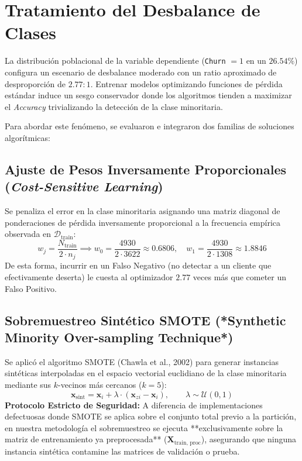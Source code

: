 \documentclass[11pt,letterpaper]{article}
\begin{document}
\section{Tratamiento del Desbalance de Clases}

La distribución poblacional de la variable dependiente (\texttt{Churn} $= 1$ en un $26.54\%$) configura un escenario de desbalance moderado con un ratio aproximado de desproporción de $2.77:1$. Entrenar modelos optimizando funciones de pérdida estándar induce un sesgo conservador donde los algoritmos tienden a maximizar el \textit{Accuracy} trivializando la detección de la clase minoritaria.

Para abordar este fenómeno, se evaluaron e integraron dos familias de soluciones algorítmicas:

\subsection{Ajuste de Pesos Inversamente Proporcionales (\textit{Cost-Sensitive Learning})}
Se penaliza el error en la clase minoritaria asignando una matriz diagonal de ponderaciones de pérdida inversamente proporcional a la frecuencia empírica observada en $\mathcal{D}_{\text{train}}$:
\begin{equation}
    w_j = \frac{N_{\text{train}}}{2 \cdot n_j} \implies w_0 = \frac{4930}{2 \cdot 3622} \approx 0.6806, \quad w_1 = \frac{4930}{2 \cdot 1308} \approx 1.8846
\end{equation}
De esta forma, incurrir en un Falso Negativo (no detectar a un cliente que efectivamente deserta) le cuesta al optimizador $2.77$ veces más que cometer un Falso Positivo.

\subsection{Sobremuestreo Sintético SMOTE (*Synthetic Minority Over-sampling Technique*)}
Se aplicó el algoritmo SMOTE (Chawla et al., 2002) para generar instancias sintéticas interpoladas en el espacio vectorial euclidiano de la clase minoritaria mediante sus $k$-vecinos más cercanos ($k=5$):
\begin{equation}
    \mathbf{x}_{\text{sint}} = \mathbf{x}_i + \lambda \cdot (\mathbf{x}_{zi} - \mathbf{x}_i), \qquad \lambda \sim \mathcal{U}(0, 1)
\end{equation}
\textbf{Protocolo Estricto de Seguridad:} A diferencia de implementaciones defectuosas donde SMOTE se aplica sobre el conjunto total previo a la partición, en nuestra metodología el sobremuestreo se ejecuta **exclusivamente sobre la matriz de entrenamiento ya preprocesada** ($\mathbf{X}_{\text{train, proc}}$), asegurando que ninguna instancia sintética contamine las matrices de validación o prueba.
\end{document}
